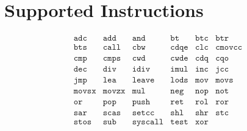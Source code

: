 \section{Supported Instructions}
\label{Supported Instructions}
\[\begin{array}{llllll}
\texttt{adc} &
\texttt{add} &
\texttt{and} &
\texttt{bt} &
\texttt{btc} &
\texttt{btr} \\
\texttt{bts} &
\texttt{call} &
\texttt{cbw} &
\texttt{cdqe} &
\texttt{clc} &
\texttt{cmovcc} \\
\texttt{cmp} &
\texttt{cmps} &
\texttt{cwd} &
\texttt{cwde} &
\texttt{cdq} &
\texttt{cqo} \\
\texttt{dec} &
\texttt{div} &
\texttt{idiv} &
\texttt{imul} &
\texttt{inc} &
\texttt{jcc} \\
\texttt{jmp} &
\texttt{lea} &
\texttt{leave} &
\texttt{lods} &
\texttt{mov} &
\texttt{movs} \\
\texttt{movsx} &
\texttt{movzx} &
\texttt{mul} &
\texttt{neg} &
\texttt{nop} &
\texttt{not} \\
\texttt{or} &
\texttt{pop} &
\texttt{push} &
\texttt{ret} &
\texttt{rol} &
\texttt{ror} \\
\texttt{sar} &
\texttt{scas} &
\texttt{setcc} &
\texttt{shl} &
\texttt{shr} &
\texttt{stc} \\
\texttt{stos} &
\texttt{sub} &
\texttt{syscall} &
\texttt{test} &
\texttt{xor} &
\end{array}\]